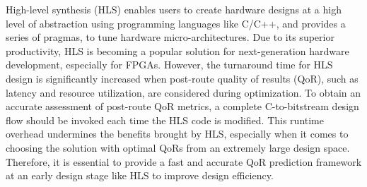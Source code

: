 \documentclass[conference]{IEEEtran}
\begin{document}
High-level synthesis (HLS) enables users to create hardware designs at a high level of abstraction using programming languages like C/C++, and provides a series of pragmas, to tune hardware micro-architectures. Due to its superior productivity, HLS is becoming a popular solution for next-generation hardware development, especially for FPGAs. 
However, the turnaround time for HLS design is significantly increased when post-route quality of results (QoR), such as latency and resource utilization, are considered during optimization. To obtain an accurate assessment of post-route QoR metrics, a complete C-to-bitstream design flow should be invoked each time the HLS code is modified.  
This runtime overhead undermines the benefits brought by HLS, especially when it comes to choosing the solution with optimal QoRs from an extremely large design space. 
Therefore, it is essential to provide a fast and accurate QoR prediction framework at an early design stage like HLS to improve design efficiency.


\end{document}
